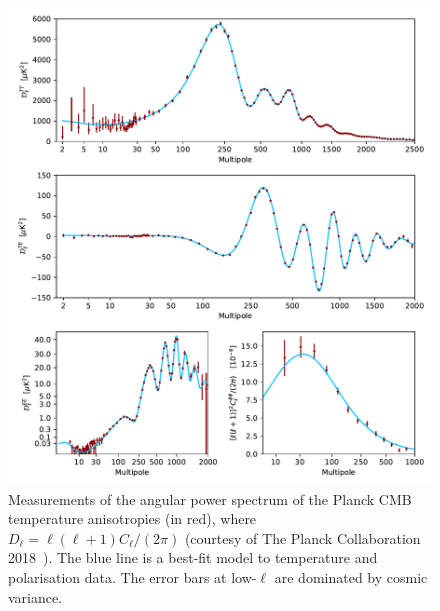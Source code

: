 \begin{figure}[htpb]
	\centering\capstart{}
	\includegraphics[trim={0 430 0 0},clip,width=\textwidth]{planck_2018_power_spectrum.pdf}
	\caption[
	The 2018 Planck CMB angular power spectrum in temperature
	]{
	Measurements of the angular power spectrum of the Planck CMB temperature anisotropies (in red), where \(D_{\ell} = \ell(\ell+1)C_{\ell}/(2\pi)\) (courtesy of The Planck Collaboration 2018~\cite{Planck2020}).
	The blue line is a best-fit model to temperature and polarisation data.
	The error bars at low-\(\ell{}\) are dominated by cosmic variance.
	}\label{fig:chapter2_power_spectrum}
\end{figure}

